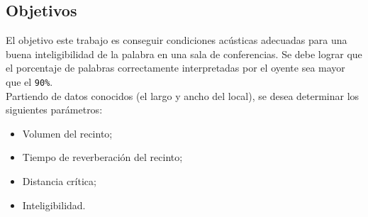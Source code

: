 	\subsection{Objetivos}
	
	El objetivo este trabajo es conseguir condiciones acústicas adecuadas para una buena inteligibilidad de la palabra en una sala de conferencias. Se debe lograr que el porcentaje de palabras correctamente interpretadas por el oyente sea mayor que el \texttt{90\%}.\\
	
	Partiendo de datos conocidos (el largo y ancho del local), se desea determinar los siguientes parámetros:
	
	\begin{itemize}
		\item Volumen del recinto;
		\item Tiempo de reverberación del recinto;
		\item Distancia crítica;
		\item Inteligibilidad.
	\end{itemize}
		
%	
%
%
